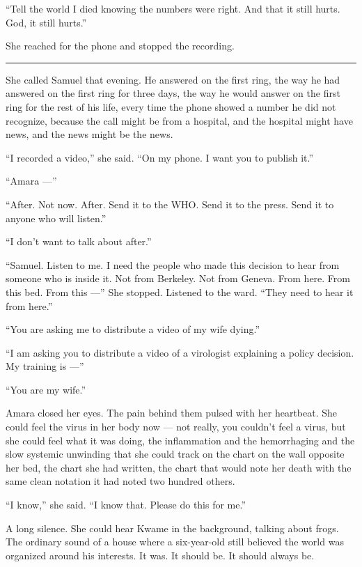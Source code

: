\documentclass[11pt]{article}
\begin{document}
``Tell the world I died knowing the numbers were right. And that it still hurts. God, it still hurts.''

She reached for the phone and stopped the recording.

\begin{center}\rule{0.3\linewidth}{0.4pt}\end{center}

She called Samuel that evening. He answered on the first ring, the way he had answered on the first ring for three days, the way he would answer on the first ring for the rest of his life, every time the phone showed a number he did not recognize, because the call might be from a hospital, and the hospital might have news, and the news might be the news.

``I recorded a video,'' she said. ``On my phone. I want you to publish it.''

``Amara ---''

``After. Not now. After. Send it to the WHO. Send it to the press. Send it to anyone who will listen.''

``I don't want to talk about after.''

``Samuel. Listen to me. I need the people who made this decision to hear from someone who is inside it. Not from Berkeley. Not from Geneva. From here. From this bed. From this ---'' She stopped. Listened to the ward. ``They need to hear it from here.''

``You are asking me to distribute a video of my wife dying.''

``I am asking you to distribute a video of a virologist explaining a policy decision. My training is ---''

``You are my wife.''

Amara closed her eyes. The pain behind them pulsed with her heartbeat. She could feel the virus in her body now --- not really, you couldn't feel a virus, but she could feel what it was doing, the inflammation and the hemorrhaging and the slow systemic unwinding that she could track on the chart on the wall opposite her bed, the chart she had written, the chart that would note her death with the same clean notation it had noted two hundred others.

``I know,'' she said. ``I know that. Please do this for me.''

A long silence. She could hear Kwame in the background, talking about frogs. The ordinary sound of a house where a six-year-old still believed the world was organized around his interests. It was. It should be. It should always be.
\end{document}
